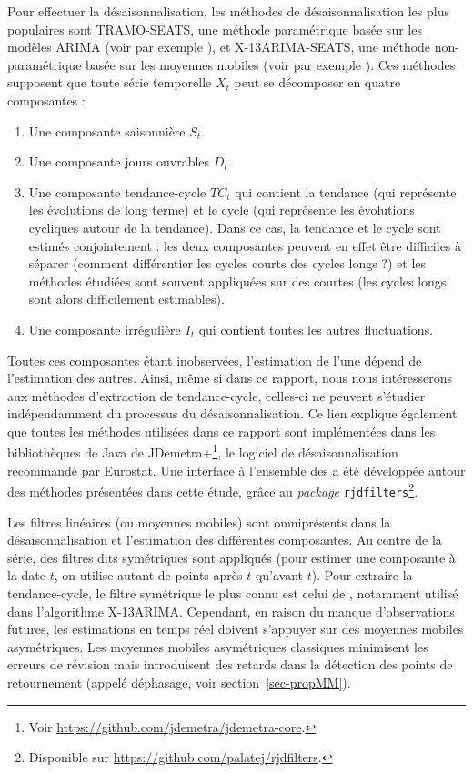 \documentclass[
  12pt,
  a4paper,french]{article}
\newcommand\1{\mathds{1}}
\begin{document}
Pour effectuer la désaisonnalisation, les méthodes de désaisonnalisation les plus populaires sont TRAMO-SEATS, une méthode paramétrique basée sur les modèles ARIMA (voir par exemple \textcite{maravall2004program}), et X-13ARIMA-SEATS, une méthode non-paramétrique basée sur les moyennes mobiles (voir par exemple \textcite{ladiray2011seasonal}).
Ces méthodes supposent que toute série temporelle \(X_t\) peut se décomposer en quatre composantes :

\begin{enumerate}
\def\labelenumi{\arabic{enumi}.}
\item
  Une composante saisonnière \(S_t\).
\item
  Une composante jours ouvrables \(D_t\).
\item
  Une composante tendance-cycle \(TC_t\) qui contient la tendance (qui représente les évolutions de long terme) et le cycle (qui représente les évolutions cycliques autour de la tendance).
  Dans ce cas, la tendance et le cycle sont estimés conjointement : les deux composantes peuvent en effet être difficiles à séparer (comment différentier les cycles courts des cycles longs ?) et les méthodes étudiées sont souvent appliquées sur des courtes (les cycles longs sont alors difficilement estimables).
\item
  Une composante irrégulière \(I_t\) qui contient toutes les autres fluctuations.
\end{enumerate}

Toutes ces composantes étant inobservées, l'estimation de l'une dépend de l'estimation des autres.
Ainsi, même si dans ce rapport, nous nous intéresserons aux méthodes d'extraction de tendance-cycle, celles-ci ne peuvent s'étudier indépendamment du processus du désaisonnalisation.
Ce lien explique également que toutes les méthodes utilisées dans ce rapport sont implémentées dans les bibliothèques de Java de JDemetra+\footnote{Voir \url{https://github.com/jdemetra/jdemetra-core}.}, le logiciel de désaisonnalisation recommandé par Eurostat.
Une interface  à l'ensemble des a été développée autour des méthodes présentées dans cette étude, grâce au \emph{package} \texttt{rjdfilters}\footnote{Disponible sur \url{https://github.com/palatej/rjdfilters}.}.

Les filtres linéaires (ou moyennes mobiles) sont omniprésents dans la désaisonnalisation et l'estimation des différentes composantes.
Au centre de la série, des filtres dits symétriques sont appliqués (pour estimer une composante à la date \(t\), on utilise autant de points après \(t\) qu'avant \(t\)).
Pour extraire la tendance-cycle, le filtre symétrique le plus connu est celui de \textcite{henderson1916note}, notamment utilisé dans l'algorithme X-13ARIMA.
Cependant, en raison du manque d'observations futures, les estimations en temps réel doivent s'appuyer sur des moyennes mobiles asymétriques.
Les moyennes mobiles asymétriques classiques minimisent les erreurs de révision mais introduisent des retards dans la détection des points de retournement (appelé déphasage, voir section~\ref{sec-propMM}).
\end{document}
